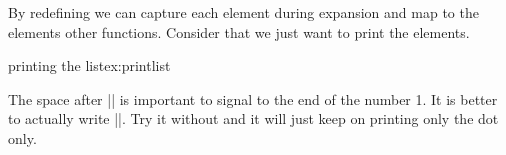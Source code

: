 By redefining  we can capture each element during expansion and map to the elements other functions. Consider that we just want to print the elements.


\begin{texexample}{printing the list}{ex:printlist}
\makeatletter
\the\auxcount
\def\printauxlist{%
  \def\@elt##1{\advance\auxcount1\relax\the\auxcount. \itshape ##1\par }
  \the\auxlist }
  

\printauxlist
\makeatother  
\end{texexample}

The space after || is important to signal to \tex the end of the number 1. It is better to actually write |\relax|. Try it without and it will just keep on printing only the dot only.



\endinput
Another use of this structure is the following: at the end of the job we can now close all auxiliary files at once, by defining,
%
%
%
%
%
%
%
%
%
%



